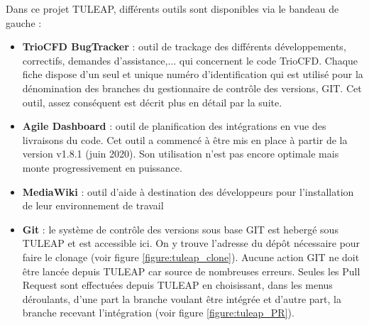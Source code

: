 Dans ce projet TULEAP, diff\'erents outils sont disponibles via le bandeau de gauche : \newline
\begin{itemize}[label=$\Rightarrow$, font=\LARGE]
   \item \textbf{TrioCFD BugTracker} : outil de trackage des diff\'erents d\'eveloppements, correctifs, demandes d'assis\-tance,... qui concernent le code TrioCFD. Chaque fiche dispose d'un seul et unique num\'ero d'identification qui est utilis\'e pour la d\'enomination des branches du gestionnaire de contr\^ole des versions, GIT. Cet outil, assez cons\'equent est d\'ecrit plus en d\'etail par la suite.
   \item \textbf{Agile Dashboard} : outil de planification des int\'egrations en vue des livraisons du code. Cet outil a commenc\'e \`a \^etre mis en place \`a partir de la version v1.8.1 (juin 2020). Son utilisation n'est pas encore optimale mais monte progressivement en puissance.
   \item \textbf{MediaWiki} : outil d'aide \`a destination des d\'eveloppeurs pour l'installation de leur environnement de travail
   \newpage
   \item \textbf{Git} : le syst\`eme de contr\^ole des versions sous base GIT est heberg\'e sous TULEAP et est accessible ici. On y trouve  l'adresse du d\'ep\^ot n\'ecessaire pour faire le clonage (voir figure \ref{figure:tuleap_clone}). Aucune action GIT ne doit \^etre lanc\'ee depuis TULEAP car source de nombreuses erreurs. Seules les Pull Request sont effectu\'ees depuis TULEAP en choisissant, dans les menus d\'eroulants, d'une part la branche voulant \^etre int\'egr\'ee et d'autre part, la branche recevant l'int\'egration (voir figure \ref{figure:tuleap_PR}).

\end{itemize}
